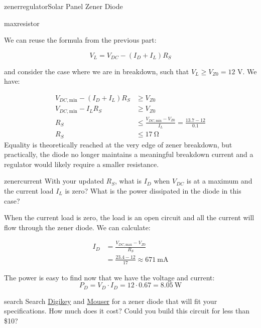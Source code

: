 \begin{mainquestion}{zenerregulator}{Solar Panel Zener Diode}
\begin{partquestion}{maxresistor}
\begin{answer}
We can reuse the formula from the previous part:

\[
V_L = V_{DC} - (I_D + I_L) R_S
\]

and consider the case where we are in breakdown, such that $V_L \geq V_{Z0} = 12\text{ V}$. We have:

\begin{align*}
V_{DC,\text{min}} - (I_D + I_L) R_S &\geq V_{Z0} \\
V_{DC,\text{min}} - I_L R_S &\geq V_{Z0} \\
R_S &\leq \frac{V_{DC,\text{min}} - V_{Z0}}{I_L} = \frac{13.7 - 12}{0.1} \\
R_S &\leq \qty{17}{\ohm}
\end{align*}
Equality is theoretically reached at the very edge of zener breakdown, but practically, the diode no longer maintains a meaningful breakdown current and a regulator would likely require a smaller resistance.
\end{answer}
\end{partquestion}

\begin{partquestion}{zenercurrent}
{With your updated $R_S$, what is $I_D$ when $V_{DC}$ is at a maximum and the current load $I_L$ is zero? What is the power dissipated in the diode in this case?}

\begin{answer}
When the current load is zero, the load is an open circuit and all the current will flow through the zener diode. We can calculate:

\begin{align*}
I_D &= \frac{V_{DC,\text{max}} - V_{Z0}}{R_S} \\
&= \frac{23.4 - 12}{17} \approx \qty{671}{\milli\ampere}
\end{align*}

The power is easy to find now that we have the voltage and current:
\[P_D = V_D \cdot I_D = 12 \cdot 0.67 = \qty{8.05}{\watt}\]

\end{answer}
\end{partquestion}

\begin{partquestion}{search}
{Search \href{https://www.digikey.com/}{Digikey} and \href{https://www.mouser.com/?srsltid=AfmBOoo5j27SqCXjzHUROxjIwUmXG71N7j6Ma3DKRVKD3fQJOXdC2enf}{Mouser} for a zener diode that will fit your specifications. How much does it cost? Could you build this circuit for less than \$10?}


\end{partquestion}
\end{mainquestion}

